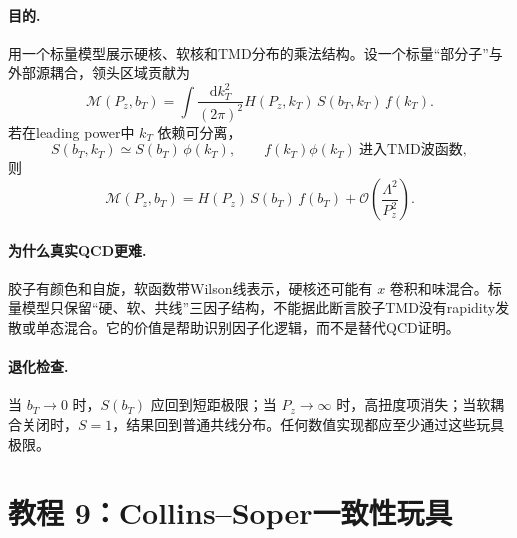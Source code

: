 \documentclass[UTF8,12pt,a4paper,twoside,openany]{ctexbook}
\newcommand{\dd}{\mathrm{d}}
\begin{document}
\paragraph{目的.} 用一个标量模型展示硬核、软核和TMD分布的乘法结构。设一个标量“部分子”与外部源耦合，领头区域贡献为
\begin{equation}
  \mathcal M(P_z,b_T)
  =\int\frac{\dd k_T^2}{(2\pi)^2}
  H(P_z,k_T)\,S(b_T,k_T)\,f(k_T).
  \label{eq:tutorial-scalar-factorization}
\end{equation}
若在leading power中 \(k_T\) 依赖可分离，
\begin{equation}
  S(b_T,k_T)\simeq S(b_T)\,\phi(k_T),
  \qquad
  f(k_T)\phi(k_T)\ \text{进入TMD波函数},
  \label{eq:tutorial-scalar-separation}
\end{equation}
则
\begin{equation}
  \mathcal M(P_z,b_T)
  =H(P_z)\,S(b_T)\,f(b_T)
  +\mathcal O\left(\frac{\Lambda^2}{P_z^2}\right).
  \label{eq:tutorial-scalar-result}
\end{equation}

\paragraph{为什么真实QCD更难.} 胶子有颜色和自旋，软函数带Wilson线表示，硬核还可能有 \(x\) 卷积和味混合。标量模型只保留“硬、软、共线”三因子结构，不能据此断言胶子TMD没有rapidity发散或单态混合。它的价值是帮助识别因子化逻辑，而不是替代QCD证明。

\paragraph{退化检查.} 当 \(b_T\to0\) 时，\(S(b_T)\) 应回到短距极限；当 \(P_z\to\infty\) 时，高扭度项消失；当软耦合关闭时，\(S=1\)，结果回到普通共线分布。任何数值实现都应至少通过这些玩具极限。

\section{教程 9：Collins--Soper一致性玩具}
\end{document}
